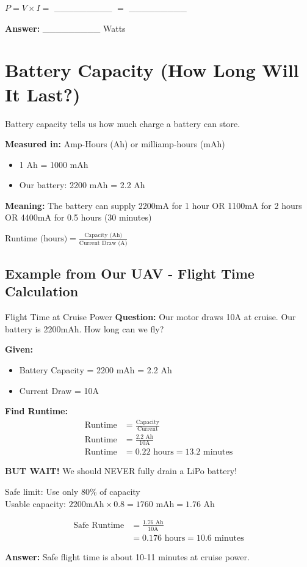 \documentclass[11pt,letterpaper]{article}
\begin{document}
$P = V \times I = $ \_\_\_\_\_\_\_\_\_ $= $ \_\_\_\_\_\_\_\_\_

\textbf{Answer:} \_\_\_\_\_\_\_\_\_ Watts

\section{Battery Capacity (How Long Will It Last?)}

Battery capacity tells us how much charge a battery can store.

\textbf{Measured in:} Amp-Hours (Ah) or milliamp-hours (mAh)
\begin{itemize}
  \item 1 Ah = 1000 mAh
  \item Our battery: 2200 mAh = 2.2 Ah
\end{itemize}

\textbf{Meaning:} The battery can supply 2200mA for 1 hour OR 1100mA for 2 hours OR 4400mA for 0.5 hours (30 minutes)

\begin{formulabox}
$\text{Runtime (hours)} = \frac{\text{Capacity (Ah)}}{\text{Current Draw (A)}}$
\end{formulabox}

\subsection{Example from Our UAV - Flight Time Calculation}

\begin{examplebox}{Flight Time at Cruise Power}
\textbf{Question:} Our motor draws 10A at cruise. Our battery is 2200mAh. How long can we fly?

\textbf{Given:}
\begin{itemize}
  \item Battery Capacity = 2200 mAh = 2.2 Ah
  \item Current Draw = 10A
\end{itemize}

\textbf{Find Runtime:}
\begin{align*}
\text{Runtime} &= \frac{\text{Capacity}}{\text{Current}}\\
\text{Runtime} &= \frac{2.2\text{ Ah}}{10\text{A}}\\
\text{Runtime} &= 0.22\text{ hours} = 13.2\text{ minutes}
\end{align*}

\textbf{BUT WAIT!} We should NEVER fully drain a LiPo battery!

Safe limit: Use only 80\% of capacity\\
Usable capacity: $2200\text{mAh} \times 0.8 = 1760\text{ mAh} = 1.76\text{ Ah}$

\begin{align*}
\text{Safe Runtime} &= \frac{1.76\text{ Ah}}{10\text{A}}\\
&= 0.176\text{ hours} = 10.6\text{ minutes}
\end{align*}

\textbf{Answer:} Safe flight time is about 10-11 minutes at cruise power.
\end{examplebox}
\end{document}
